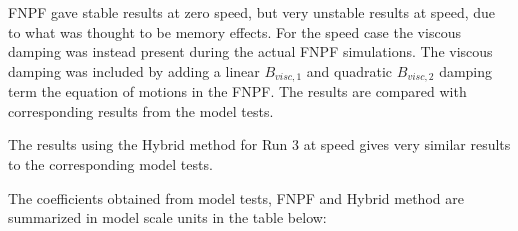     FNPF gave stable results at zero speed, but very unstable results at
speed, due to what was thought to be memory effects. For the speed case
the viscous damping was instead present during the actual FNPF
simulations. The viscous damping was included by adding a linear
\(B_{visc,1}\) and quadratic \(B_{visc,2}\) damping term the equation of
motions in the FNPF. The results are compared with corresponding results
from the model tests.

    \begin{figure}
        \begin{center}\end{center}
        \caption{}
        \label{fig:}
    \end{figure}
    
    The results using the Hybrid method for Run 3 at speed gives very
similar results to the corresponding model tests.

    \begin{figure}
        \begin{center}\end{center}
        \caption{}
        \label{fig:}
    \end{figure}
    
    The coefficients obtained from model tests, FNPF and Hybrid method are
summarized in model scale units in the table below:
 
            
    
